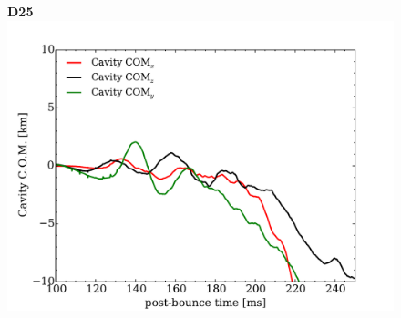 \documentclass[aspectratio=169]{beamer}
\begin{document}
\begin{frame}
\begin{columns}[c]
    \begin{figure}
      \textbf{D25}
      \includegraphics[width=1.0\textwidth]{Figures/D25_com.pdf}
    \end{figure}

  \end{columns}

\end{frame}
\end{document}
